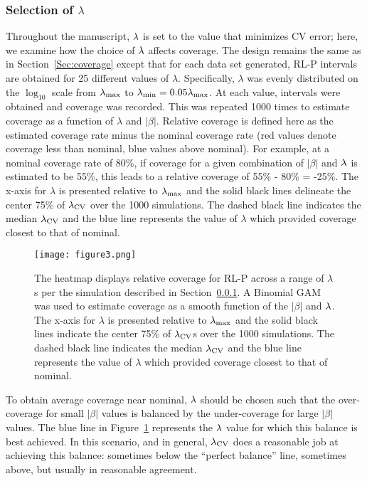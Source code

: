 \subsubsection{Selection of \texorpdfstring{$\lambda$}{lambda}} \label{Sec:lambda}

Throughout the manuscript, $\lambda$ is set to the value that minimizes CV error; here, we examine how the choice of $\lambda$ affects coverage. The design remains the same as in Section~\ref{Sec:coverage} except that for each data set generated, RL-P intervals are obtained for 25 different values of $\lambda$. Specifically, $\lambda$ was evenly distributed on the $\log_{10}$ scale from $\lambda_{\max}$ to $\lambda_{\min} = 0.05 \lambda_{\max}$. At each value, intervals were obtained and coverage was recorded. This was repeated 1000 times to estimate coverage as a function of $\lambda$ and $|\beta|$. Relative coverage is defined here as the estimated coverage rate minus the nominal coverage rate (red values denote coverage less than nominal, blue values above nominal). For example, at a nominal coverage rate of 80\%, if coverage for a given combination of $|\beta|$ and $\lambda$ is estimated to be 55\%, this leads to a relative coverage of 55\% - 80\% = -25\%. The x-axis for $\lambda$ is presented relative to $\lambda_{\max}$ and the solid black lines delineate the center 75\% of $\lambda_{\textrm{CV}}$ over the 1000 simulations. The dashed black line indicates the median $\lambda_{\textrm{CV}}$ and the blue line represents the value of $\lambda$ which provided coverage closest to that of nominal.

\begin{figure}[htb!]
  \begin{center}
    \texttt{[image: figure3.png]}
    \caption{\label{fig:3} The heatmap displays relative coverage for RL-P across a range of $\lambda$s per the simulation described in Section~\ref{Sec:lambda}. A Binomial GAM was used to estimate coverage as a smooth function of the $|\beta|$ and $\lambda$. The x-axis for $\lambda$ is presented relative to $\lambda_{\max}$ and the solid black lines indicate the center 75\% of $\lambda_{\textrm{CV}}$s over the 1000 simulations. The dashed black line indicates the median $\lambda_{\textrm{CV}}$ and the blue line represents the value of $\lambda$ which provided coverage closest to that of nominal.}
  \end{center}
\end{figure}

To obtain average coverage near nominal, $\lambda$ should be chosen such that the over-coverage for small $|\beta|$ values is balanced by the under-coverage for large $|\beta|$ values. The blue line in Figure~\ref{fig:3} represents the $\lambda$ value for which this balance is best achieved. In this scenario, and in general, $\lambda_{\textrm{CV}}$ does a reasonable job at achieving this balance: sometimes below the ``perfect balance'' line, sometimes above, but usually in reasonable agreement.

